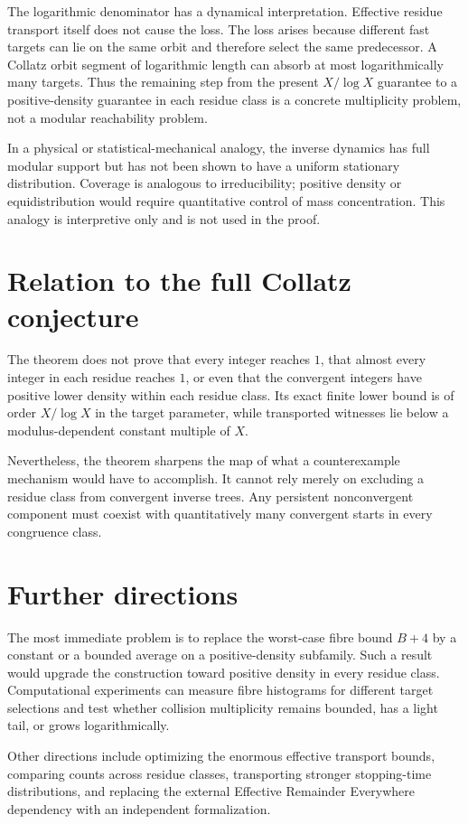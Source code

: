 \documentclass[11pt]{article}
\theoremstyle{definition}
\theoremstyle{remark}
\begin{document}
The logarithmic denominator has a dynamical interpretation.  Effective
residue transport itself does not cause the loss.  The loss arises because
different fast targets can lie on the same orbit and therefore select the same
predecessor.  A Collatz orbit segment of logarithmic length can absorb at most
logarithmically many targets.  Thus the remaining step from the present
$X/\log X$ guarantee to a positive-density guarantee in each residue class is
a concrete multiplicity problem, not a modular reachability problem.

In a physical or statistical-mechanical analogy, the inverse dynamics has
full modular support but has not been shown to have a uniform stationary
distribution.  Coverage is analogous to irreducibility; positive density or
equidistribution would require quantitative control of mass concentration.
This analogy is interpretive only and is not used in the proof.

\section{Relation to the full Collatz conjecture}
The theorem does not prove that every integer reaches $1$, that almost every
integer in each residue reaches $1$, or even that the convergent integers have
positive lower density within each residue class.  Its exact finite lower
bound is of order $X/\log X$ in the target parameter, while transported
witnesses lie below a modulus-dependent constant multiple of $X$.

Nevertheless, the theorem sharpens the map of what a counterexample mechanism
would have to accomplish.  It cannot rely merely on excluding a residue class
from convergent inverse trees.  Any persistent nonconvergent component must
coexist with quantitatively many convergent starts in every congruence class.

\section{Further directions}
The most immediate problem is to replace the worst-case fibre bound $B+4$ by
a constant or a bounded average on a positive-density subfamily.  Such a result
would upgrade the construction toward positive density in every residue
class.  Computational experiments can measure fibre histograms for different
target selections and test whether collision multiplicity remains bounded,
has a light tail, or grows logarithmically.

Other directions include optimizing the enormous effective transport bounds,
comparing counts across residue classes, transporting stronger stopping-time
distributions, and replacing the external Effective Remainder Everywhere
dependency with an independent formalization.
\end{document}
